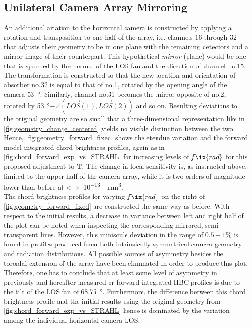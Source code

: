         \subsection*{Unilateral Camera Array Mirroring}%
%
            An additional ariation to the horizontal camera is constructed by applying a rotation and transposition to one half of the array, i.e. channels 16 through 32 that adjusts their geometry to be in one plane with the remaining detectors and a mirror image of their counterpart. This hypothetical \textit{mirror} (plane) would be one that is spanned by the normal of the LOS fan and the direction of channel no.15. The transformation is constructed so that the new location and orientation of absorber no.32 is equal to that of no.1, rotated by the opening angle of the camera \SI{53}{\degree}. Similarly, channel no.31 becomes the mirror opposite of no.2, rotated by \SI{53}{\degree}$-\angle\left(\vec{LOS}(1), \vec{LOS}(2)\right)$ and so on. Resulting deviations to the original geometry are so small that a three-dimensional representation like in \cref{fig:geometry_change_centered} yields no visible distinction between the two. Hence, \cref{fig:geometry_forward_fixed} shows the etendue variation and the forward model integrated chord brightness profiles, again as in \cref{fig:chord_forward_exp_vs_STRAHL} for increasing levels of $f\ix{rad}$ for this proposed adjustment to $\mathbf{T}$. The change in local sensitivity is, as instructed above, limited to the upper half of the camera array, while it is two orders of magnitude lower than before at <\SI[per-mode=reciprocal]{e-13}{\per\cubic\milli\meter}.\\%
            The chord brightness profiles for varying $f\ix{rad}$ on the right of \cref{fig:geometry_forward_fixed} are constructed the same way as before. With respect to the initial results, a decrease in variance between left and right half of the plot can be noted when inspecting the corresponding mirrored, semi-transparent lines. However, this miniscule deviation in the range of $0.5-1\%$ is found in profiles produced from both intrinsically symmetrical camera geometry and radiation distributions. All possible sources of asymmetry besides the toroidal extension of the array have been eliminated in order to produce this plot. Therefore, one has to conclude that at least some level of asymmetry in previously and hereafter measured or forward integrated HBC profiles is due to the tilt of the LOS fan of \SI{68.75}{\degree}. Furthermore, the difference between this chord brightness profile and the initial results using the original geometry from \cref{fig:chord_forward_exp_vs_STRAHL} hence is dominated by the variation among the individual horizontal camera LOS.\\%
